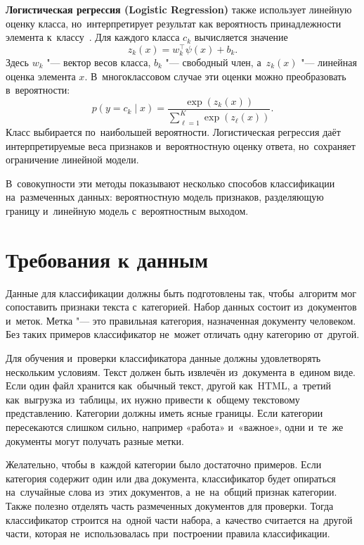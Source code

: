 \textbf{Логистическая регрессия (Logistic Regression)} также использует
линейную оценку класса, но~интерпретирует результат как вероятность
принадлежности элемента к~классу~\autocite{Fan2008LIBLINEAR}. Для каждого
класса \( c_k \) вычисляется значение
\begin{equation}
    \label{eq:logistic-score}
    z_k(x)=w_k^\top \psi(x)+b_k.
\end{equation}
Здесь \( w_k \) "--- вектор весов класса, \( b_k \) "--- свободный член,
а~\( z_k(x) \) "--- линейная оценка элемента \( x \). В~многоклассовом случае
эти оценки можно преобразовать в~вероятности:
\begin{equation}
    \label{eq:logistic-softmax}
    p(y=c_k \mid x)=
    \frac{\exp(z_k(x))}
    {\sum_{\ell=1}^{K}\exp(z_{\ell}(x))}.
\end{equation}
Класс выбирается по~наибольшей вероятности. Логистическая регрессия даёт
интерпретируемые веса признаков и~вероятностную оценку ответа, но~сохраняет
ограничение линейной модели.

В~совокупности эти методы показывают несколько способов классификации
на~размеченных данных: вероятностную модель признаков, разделяющую границу
и~линейную модель с~вероятностным выходом.

\section{Требования к данным}\label{sec:ch1/data}

Данные для классификации должны быть подготовлены так, чтобы~алгоритм мог
сопоставить признаки текста с~категорией. Набор данных состоит из~документов
и~меток. Метка "--- это правильная категория, назначенная документу человеком.
Без таких примеров классификатор не~может отличать одну категорию от~другой.

Для обучения и~проверки классификатора данные должны удовлетворять нескольким
условиям. Текст должен быть извлечён из~документа в~едином виде. Если один файл
хранится как~обычный текст, другой как~HTML, а~третий как~выгрузка из~таблицы,
их нужно привести к~общему текстовому представлению. Категории должны иметь
ясные границы. Если категории пересекаются слишком сильно, например «работа»
и~«важное», одни и~те~же документы могут получать разные метки.

Желательно, чтобы в~каждой категории было достаточно примеров. Если категория
содержит один или два документа, классификатор будет опираться на~случайные
слова из~этих документов, а~не~на~общий признак категории. Также полезно
отделять часть размеченных документов для проверки. Тогда классификатор
строится на~одной части набора, а~качество считается на~другой части, которая
не~использовалась при~построении правила классификации.

